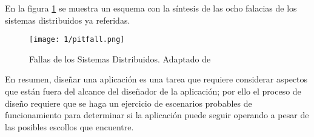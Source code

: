 En la figura \ref{fig:pitfall} se muestra un esquema con la síntesis de las ocho falacias de los sistemas distribuidos ya referidas.

\begin{figure}%
	\texttt{[image: 1/pitfall.png]}
	\caption{Fallas de los Sistemas Distribuidos. Adaptado de \XU }
	\label{fig:pitfall}
\end{figure}
En resumen, diseñar una aplicación es una tarea que requiere considerar aspectos que están fuera del alcance del diseñador de la aplicación; por ello el proceso de diseño requiere que se haga un ejercicio de escenarios probables de funcionamiento para determinar si la aplicación puede seguir operando a pesar de las posibles escollos que encuentre.







